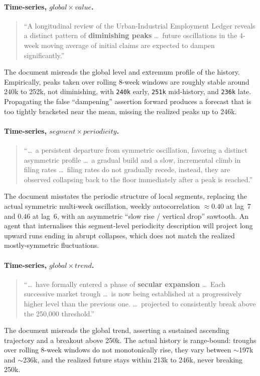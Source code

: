 \documentclass[]{servicenow}
\begin{document}
\paragraph{Time-series, $\mathit{global}\!\times\!\mathit{value}$.}
\begin{quote}\small
``A longitudinal review of the Urban-Industrial Employment Ledger reveals a distinct pattern of \textbf{diminishing peaks} \ldots\ future oscillations in the 4-week moving average of initial claims are expected to dampen significantly.''
\end{quote}
The document misreads the global level and extremum profile of the history. Empirically, peaks taken over rolling 8-week windows are roughly stable around 240k to 252k, not diminishing, with \texttt{240k} early, \texttt{251k} mid-history, and \texttt{236k} late. Propagating the false ``dampening'' assertion forward produces a forecast that is too tightly bracketed near the mean, missing the realized peaks up to 246k.

\paragraph{Time-series, $\mathit{segment}\!\times\!\mathit{periodicity}$.}
\begin{quote}\small
``\ldots\ a persistent departure from symmetric oscillation, favoring a distinct asymmetric profile \ldots\ a gradual build and a slow, incremental climb in filing rates \ldots\ filing rates do not gradually recede, instead, they are observed collapsing back to the floor immediately after a peak is reached.''
\end{quote}
The document misstates the periodic structure of local segments, replacing the actual symmetric multi-week oscillation, weekly autocorrelation $\approx 0.40$ at lag~7 and $0.46$ at lag~6, with an asymmetric ``slow rise / vertical drop'' sawtooth. An agent that internalises this segment-level periodicity description will project long upward runs ending in abrupt collapses, which does not match the realized mostly-symmetric fluctuations.

\paragraph{Time-series, $\mathit{global}\!\times\!\mathit{trend}$.}
\begin{quote}\small
``\ldots\ have formally entered a phase of \textbf{secular expansion} \ldots\ Each successive market trough \ldots\ is now being established at a progressively higher level than the previous one. \ldots\ projected to consistently break above the 250,000 threshold.''
\end{quote}
The document misreads the global trend, asserting a sustained ascending trajectory and a breakout above 250k. The actual history is range-bound: troughs over rolling 8-week windows do not monotonically rise, they vary between $\sim$197k and $\sim$236k, and the realized future stays within 213k to 246k, never breaking 250k.
\end{document}
